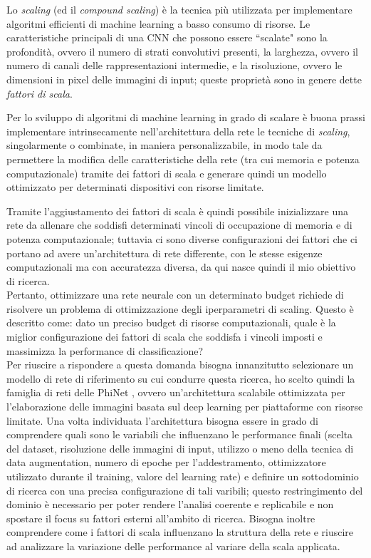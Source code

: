 Lo \textit{scaling} (ed il \textit{compound scaling}) è la tecnica più utilizzata per implementare algoritmi efficienti di machine learning a basso consumo di risorse. Le caratteristiche principali di una CNN che possono essere ``scalate" sono la profondità, ovvero il numero di strati convolutivi presenti, la larghezza, ovvero il numero di canali delle rappresentazioni intermedie, e la risoluzione, ovvero le dimensioni in pixel delle immagini di input; queste proprietà sono in genere dette \textit{fattori di scala}.

Per lo sviluppo di algoritmi di machine learning in grado di scalare è buona prassi implementare intrinsecamente nell'architettura della rete le tecniche di \textit{scaling}, singolarmente o combinate, in maniera personalizzabile, in modo tale da permettere la modifica delle caratteristiche della rete (tra cui memoria e potenza computazionale) tramite dei fattori di scala e generare quindi un modello ottimizzato per determinati dispositivi con risorse limitate. 

Tramite l'aggiustamento dei fattori di scala è quindi possibile inizializzare una rete da allenare che soddisfi determinati vincoli di occupazione di memoria e di potenza computazionale; tuttavia ci sono diverse configurazioni dei fattori che ci portano ad avere un'architettura di rete differente, con le stesse esigenze computazionali ma con accuratezza diversa, da qui nasce quindi il mio obiettivo di ricerca. \\

Pertanto, ottimizzare una rete neurale con un determinato budget richiede di risolvere un problema di ottimizzazione degli iperparametri di scaling. Questo è descritto come: dato un preciso budget di risorse computazionali, quale è la miglior configurazione dei fattori di scala che soddisfa i vincoli imposti e massimizza la performance di classificazione? \\

Per riuscire a rispondere a questa domanda bisogna innanzitutto selezionare un modello di rete di riferimento su cui condurre questa ricerca, ho scelto quindi la famiglia di reti delle PhiNet \cite{10.1145/3510832}, ovvero un'architettura scalabile ottimizzata per l'elaborazione delle immagini basata sul deep learning per piattaforme con risorse limitate.
Una volta individuata l'architettura bisogna essere in grado di comprendere quali sono le variabili che influenzano le performance finali (scelta del dataset, risoluzione delle immagini di input, utilizzo o meno della tecnica di data augmentation,  numero di epoche per l'addestramento, ottimizzatore utilizzato durante il training, valore del learning rate) e definire un sottodominio di ricerca con una precisa configurazione di tali varibili; questo restringimento del dominio è necessario per poter rendere l'analisi coerente e replicabile e non spostare il focus su fattori esterni all'ambito di ricerca. Bisogna inoltre comprendere come i fattori di scala influenzano la struttura della rete e riuscire ad analizzare la variazione delle performance al variare della scala applicata.

